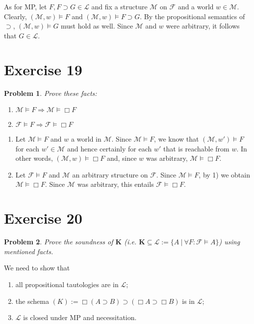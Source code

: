 \documentclass[a4paper,10pt]{article}
\newcommand{\imp}{\supset}
\newcommand{\K}{\textbf{K}}
\newcommand{\F}{\mathcal{F}}
\renewcommand{\L}{\mathcal{L}}
\newcommand{\M}{\mathcal{M}}
\newtheorem*{problem*}{Problem}
\theoremstyle{definition}
\begin{document}
As for MP, let $F, F \imp G \in \L$ and fix a structure $\M$ on $\F$ and a world $w \in \M$. Clearly, $(\M, w) \models F$ and $(\M, w) \models F \imp G$. By the propositional semantics of $\imp$, $(\M, w) \models G$ must hold as well. Since $\M$ and $w$ were arbitrary, it follows that $G \in \L$.

\section{Exercise 19}
\begin{problem*}
 Prove these facts:
 \begin{enumerate}
  \item $\M \models F \Rightarrow \M \models \Box F$
  \item $\F \models F \Rightarrow \F \models \Box F$
 \end{enumerate}
\end{problem*}

\begin{enumerate}
 \item Let $\M \models F$ and $w$ a world in $\M$. Since $\M \models F$, we know that $(\M, w') \models F$ for each $w' \in \M$ and hence certainly for each $w'$ that is reachable from $w$. In other words, $(\M, w) \models \Box F$ and, since $w$ was arbitrary, $\M \models \Box F$.
 \item Let $\F \models F$ and $\M$ an arbitrary structure on $\F$. Since $\M \models F$, by 1) we obtain $\M \models \Box F$. Since $\M$ was arbitrary, this entails $\F \models \Box F$.
\end{enumerate}


\section{Exercise 20}
\begin{problem*}
 Prove the soundness of $\K$ (i.e. $\K \subseteq \L := \{A \ |\  \forall F: \F \models A\}$) using mentioned facts.
\end{problem*}

We need to show that
\begin{enumerate}
 \item all propositional tautologies are in $\L$;
 \item the schema $(K) := \Box(A \imp B) \imp (\Box A \imp \Box B)$ is in $\L$;
 \item $\L$ is closed under MP and necessitation.
\end{enumerate}
\end{document}
